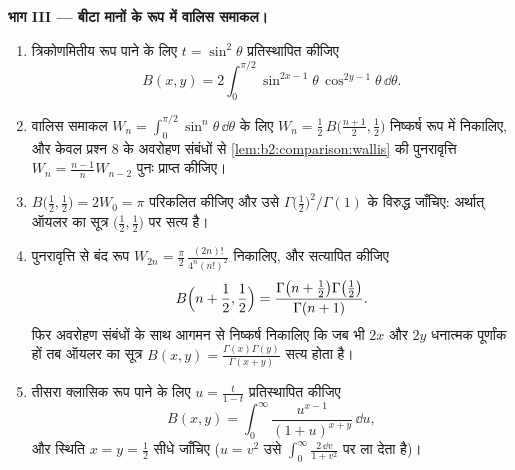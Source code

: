 \begin{problem}
\medskip
\noindent\textbf{भाग III --- बीटा मानों के रूप में वालिस समाकल।}
\begin{enumerate}[resume]
  \item त्रिकोणमितीय रूप पाने के लिए $t = \sin^2\theta$ प्रतिस्थापित कीजिए
        \[
        B(x, y) = 2\int_0^{\pi/2}
        \sin^{2x-1}\theta\,\cos^{2y-1}\theta\,\dd\theta .
        \]
  \item वालिस समाकल $W_n = \int_0^{\pi/2}\sin^n
        \theta\,\dd\theta$ के लिए $W_n = \frac12\,B\bigl(\frac{n+1}2, \frac12\bigr)$ निष्कर्ष रूप में निकालिए, और केवल
        प्रश्न 8 के अवरोहण संबंधों से \cref{lem:b2:comparison:wallis} की पुनरावृत्ति $W_n =
        \frac{n-1}{n}W_{n-2}$ पुनः
        प्राप्त कीजिए।
  \item $B\bigl(\frac12, \frac12\bigr) = 2W_0 = \pi$ परिकलित कीजिए और उसे $\Gamma\bigl(\frac12\bigr)^2/\Gamma(1)$ के विरुद्ध जाँचिए: अर्थात् ऑयलर का
        सूत्र $\bigl(\frac12,
        \frac12\bigr)$ पर सत्य है।
  \item पुनरावृत्ति से बंद रूप $W_{2n} = \frac\pi2\,
        \frac{(2n)!}{4^n(n!)^2}$ निकालिए, और सत्यापित कीजिए
        \[
        B\Bigl(n + \frac12, \frac12\Bigr)
        = \frac{\Gamma\bigl(n + \frac12\bigr)\Gamma\bigl(
        \frac12\bigr)}{\Gamma(n+1)} .
        \]
        फिर अवरोहण संबंधों के साथ आगमन से निष्कर्ष निकालिए कि जब भी $2x$
        और $2y$ धनात्मक पूर्णांक हों तब ऑयलर का सूत्र $B(x,y) =
        \frac{\Gamma(x)\Gamma(y)}{\Gamma(x+y)}$ सत्य होता है।
  \item तीसरा क्लासिक रूप पाने के लिए $u = \frac{t}{1-t}$ प्रतिस्थापित कीजिए
        \[
        B(x,y) = \int_0^\infty
        \frac{u^{x-1}}{(1+u)^{x+y}}\,\dd u ,
        \]
        और स्थिति $x = y = \frac12$ सीधे जाँचिए ($u = v^2$ उसे $\int_0^\infty\frac{2\,\dd v}{1+v^2}$ पर ला देता है)।
\end{enumerate}


\end{problem}
